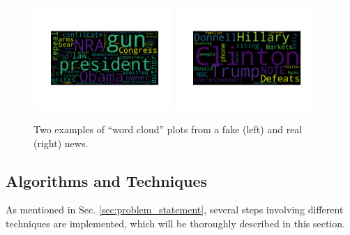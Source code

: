 \documentclass[a4paper,12pt]{article} %
\begin{document}
\begin{figure}[h!]
\caption{Two examples of ``word cloud'' plots from a fake (left) and real (right) news. \label{fig:wcloud}}
\begin{center}
\includegraphics[width=0.47\textwidth]{plots/wcloud_fake} \hspace{0.2cm}
\includegraphics[width=0.47\textwidth]{plots/wcloud_real}
\end{center}
\end{figure}

\newpage
\subsection{Algorithms and Techniques}
\label{sec:algos}
As mentioned in Sec. \ref{sec:problem_statement}, several steps involving
different techniques are implemented, which will be thoroughly described in this section.
\end{document}
